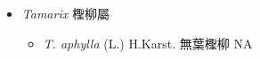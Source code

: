 
  \begin{itemize}
 \item[] \textit{Tamarix} 檉柳屬
                                
  \begin{itemize}
        \item[] \textit{T. aphylla} (L.) H.Karst.  無葉檉柳   NA
  \end{itemize}
  \end{itemize}
